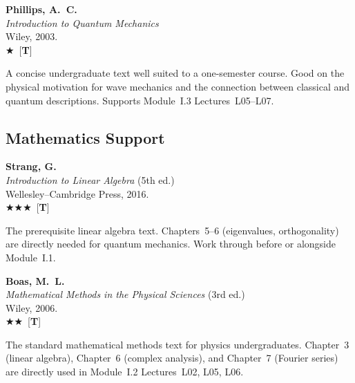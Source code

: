 \documentclass[11pt,a4paper]{article}
\newcommand{\essential}{$\bigstar\bigstar\bigstar$}
\newcommand{\recommended}{$\bigstar\bigstar$}
\newcommand{\useful}{$\bigstar$}
\newenvironment{bibentry}[1]{\begin{tcolorbox}[entrybox=#1,top=4pt,bottom=4pt]}{\end{tcolorbox}\smallskip}
\begin{document}
\begin{bibentry}{t2light}
\textbf{Phillips, A.~C.}\\
\textit{Introduction to Quantum Mechanics}\\
Wiley, 2003.\\[3pt]
\useful\ [\textbf{T}]\\[3pt]
\begin{tcolorbox}[annotbox]
A concise undergraduate text well suited to a one-semester course. Good on the
physical motivation for wave mechanics and the connection between classical and
quantum descriptions. Supports Module~I.3 Lectures~L05--L07.
\end{tcolorbox}
\end{bibentry}

\subsection{Mathematics Support}

\begin{bibentry}{t2light}
\textbf{Strang, G.}\\
\textit{Introduction to Linear Algebra} (5th ed.)\\
Wellesley--Cambridge Press, 2016.\\[3pt]
\essential\ [\textbf{T}]\\[3pt]
\begin{tcolorbox}[annotbox]
The prerequisite linear algebra text. Chapters~5--6 (eigenvalues, orthogonality)
are directly needed for quantum mechanics. Work through before or alongside Module~I.1.
\end{tcolorbox}
\end{bibentry}

\begin{bibentry}{t2light}
\textbf{Boas, M.~L.}\\
\textit{Mathematical Methods in the Physical Sciences} (3rd ed.)\\
Wiley, 2006.\\[3pt]
\recommended\ [\textbf{T}]\\[3pt]
\begin{tcolorbox}[annotbox]
The standard mathematical methods text for physics undergraduates. Chapter~3
(linear algebra), Chapter~6 (complex analysis), and Chapter~7 (Fourier series)
are directly used in Module~I.2 Lectures~L02, L05, L06.
\end{tcolorbox}
\end{bibentry}
\end{document}
